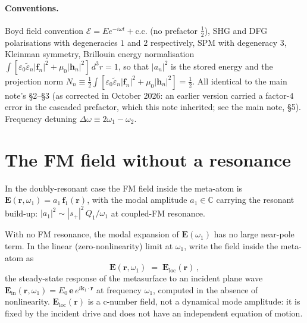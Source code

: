 \documentclass[11pt,a4paper]{article}
\newcommand{\eps}{\varepsilon}
\newcommand{\epstilde}{\widetilde{\varepsilon}}
\newcommand{\bvec}[1]{\mathbf{#1}}
\newcommand{\E}{\bvec{E}}
\newcommand{\f}{\bvec{f}}
\newcommand{\h}{\bvec{h}}
\newcommand{\ri}{\bvec{r}}
\newcommand{\dthreer}{\,d^{3}r}
\newcommand{\Dom}{\Delta\omega}
\newcommand{\Einc}{\E_{\text{loc}}}
\begin{document}
\paragraph{Conventions.}
Boyd field convention $\mathcal{E}=E e^{-i\omega t}+\text{c.c.}$ (no
prefactor $\tfrac12$), SHG and DFG polarisations with degeneracies $1$
and $2$ respectively, SPM with degeneracy $3$, Kleinman symmetry, Brillouin
energy normalisation
$\int[\eps_0\epstilde_n|\f_n|^{2}+\mu_0|\h_n|^{2}]\dthreer=1$, so that
$|a_n|^2$ is the stored energy and the projection norm
$N_n\equiv\tfrac12\int[\eps_0\epstilde_n|\f_n|^{2}+\mu_0|\h_n|^{2}]=\tfrac12$.
All identical to the main note's \S 2--\S 3 (as corrected in October
2026: an earlier version carried a factor-$4$ error in the cascaded
prefactor, which this note inherited; see the main note, \S 5).
Frequency detuning $\Dom\equiv 2\omega_1-\omega_2$.

\section{The FM field without a resonance}\label{sec:Eloc}

In the doubly-resonant case the FM field inside the meta-atom is
$\E(\ri,\omega_1)=a_1\,\f_1(\ri)$, with the modal amplitude $a_1\in
\mathbb{C}$ carrying the resonant build-up:
$|a_1|^{2}\sim |s_+|^{2}\,Q_1/\omega_1$ at coupled-FM resonance.

With no FM resonance, the modal expansion of $\E(\omega_1)$ has no large
near-pole term.  In the linear (zero-nonlinearity) limit at $\omega_1$,
write the field inside the meta-atom as
\begin{equation}
  \E(\ri,\omega_1)\;=\;\Einc(\ri)\,,
  \label{eq:Eloc-def}
\end{equation}
the steady-state response of the metasurface to an incident plane wave
$\E_\text{in}(\ri,\omega_1)=E_0\,\hat{\bm e}\,e^{i\mathbf k_1\!\cdot\ri}$
at frequency $\omega_1$, computed in the absence of nonlinearity.
$\Einc(\ri)$ is a c-number field, not a dynamical mode amplitude: it is
fixed by the incident drive and does not have an independent equation of
motion.
\end{document}
